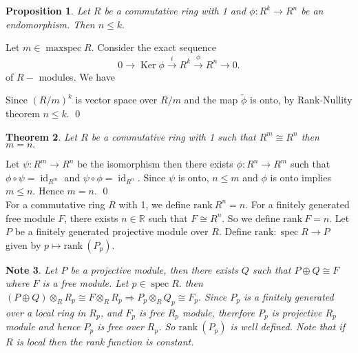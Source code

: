 \documentclass[11pt]{amsart}
\newtheorem{theorem}{Theorem}[section]
\newtheorem{note}[theorem]{Note}
\newtheorem{prop}[theorem]{Proposition}
\newcommand{\RR}{\mathbb R}
\newcommand\isom{\mathrel{\stackon[-0.1ex]{\makebox*{\scalebox{1.08}{\AC}}{=\hfill\llap{=}}}{{\AC}}}}
\newcommand\nvisom{\rotatebox[origin=cc] {-90}{$ \isom $}}
\newcommand{\rk}[1]{\text{rank}~#1}
\DeclareMathOperator{\Ker}{\text{Ker}}
\DeclareMathOperator{\spec}{\text{spec}}
\DeclareMathOperator{\mspec}{\text{maxspec}}
\DeclareMathOperator{\id}{\text{id}}
\begin{document}
\begin{prop}

Let $R$ be a commutative ring with 1 and $\phi:R^k\to R^n$ be an endomorphism. Then $n\leq k.$

\end{prop}

\proof Let $m\in\mspec R.$ Consider the exact sequence \begin{equation}
0\to \Ker\phi\xrightarrow{i} R^k\xrightarrow{\phi} R^n\to 0.
\end{equation}
of $R-$ modules. We have 

\begin{center}


\end{center}

Since $(R/m)^k$ is vector space over $R/m$ and the map $\tilde{\phi}$ is onto, by Rank-Nullity theorem $n\leq k.$ \qed

\begin{theorem}

Let $R$ be a commutative ring with 1 such that $R^m\cong R^n$ then $m=n.$

\end{theorem}

\proof Let $\psi:R^m\to R^n$ be the isomorphism then there exists $\phi:R^n\to R^m$ such that $\phi\circ \psi=\id_{R^m}$ and $\psi\circ \phi=\id_{R^n}.$ Since $\psi$ is onto, $n\leq m$ and $\phi$ is onto implies $m\leq n.$ Hence $m=n.$ \qed \\

For a commutative ring $R$ with 1, we define $\rk{R^n}=n$. For a finitely generated free module $F$, there exists $n\in {\RR}$ such that $F\cong R^n$. So we define $\rk{F}=n.$ Let $P$ be a finitely generated projective module over $R.$ Define $\text{rank}:\spec R\to P$ given by $p\mapsto \rk{(P_p)}.$ 
 
\begin{note}

Let $P$ be a projective module, then there exists $Q$ such that $P\oplus Q\cong F$ where $F$ is a free module. Let $p\in \spec R.$ then $(P\oplus Q)\otimes_R R_p\cong F\otimes_R R_p \Rightarrow P_p\otimes_R Q_p\cong F_p.$ Since $P_p$ is a finitely generated over a local ring in $R_p$, and $F_p$ is free $R_p$ module, therefore $P_p$ is projective $R_p$ module and hence $P_p$ is free over $R_p$. So $\rk{(P_p)}$ is well defined. Note that if $R$ is local then the rank function is constant.

\end{note}
\end{document}

